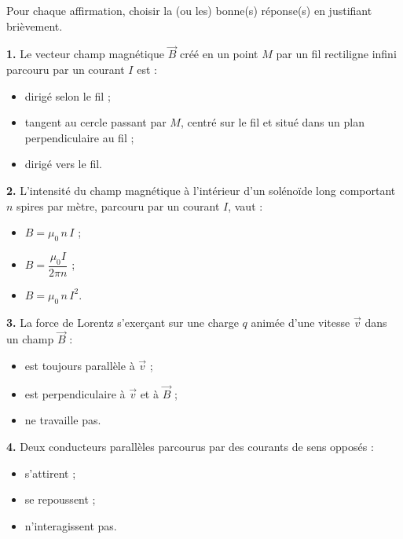 \documentclass[11pt]{article}
\begin{document}
\begin{exercice}
Pour chaque affirmation, choisir la (ou les) bonne(s) réponse(s) en justifiant brièvement.

\textbf{1.} Le vecteur champ magnétique $\vec{B}$ créé en un point $M$ par un fil rectiligne infini parcouru par un courant $I$ est :
\begin{itemize}
\item[a)] dirigé selon le fil ;
\item[b)] tangent au cercle passant par $M$, centré sur le fil et situé dans un plan perpendiculaire au fil ;
\item[c)] dirigé vers le fil.
\end{itemize}

\textbf{2.} L'intensité du champ magnétique à l'intérieur d'un solénoïde long comportant $n$ spires par mètre, parcouru par un courant $I$, vaut :
\begin{itemize}
\item[a)] $B = \mu_0\, n\, I$ ;
\item[b)] $B = \dfrac{\mu_0 I}{2\pi n}$ ;
\item[c)] $B = \mu_0\, n\, I^2$.
\end{itemize}

\textbf{3.} La force de Lorentz s'exerçant sur une charge $q$ animée d'une vitesse $\vec{v}$ dans un champ $\vec{B}$ :
\begin{itemize}
\item[a)] est toujours parallèle à $\vec{v}$ ;
\item[b)] est perpendiculaire à $\vec{v}$ et à $\vec{B}$ ;
\item[c)] ne travaille pas.
\end{itemize}

\textbf{4.} Deux conducteurs parallèles parcourus par des courants de sens opposés :
\begin{itemize}
\item[a)] s'attirent ;
\item[b)] se repoussent ;
\item[c)] n'interagissent pas.
\end{itemize}
\end{exercice}
\end{document}
